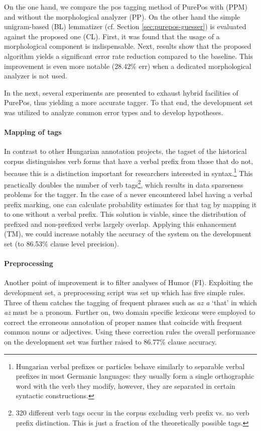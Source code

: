 On the one hand, we compare the \gls{pos} tagging method of PurePos with (PPM) and without the morphological analyzer (PP).
On the other hand the simple unigram-based (BL) lemmatizer (cf. Section \ref{sec:purepos-guesser}) is evaluated against the proposed one (CL). 
First, it was found that the usage of a morphological component is indispensable. 
Next, results show that the proposed algorithm yields a significant error rate reduction compared to the baseline. 
This improvement is even more notable  (28.42\% \acrshort{err}) when a dedicated morphological analyzer is not used.

In the next, several experiments are presented to exhaust hybrid facilities of PurePos, thus yielding a more accurate tagger. 
To that end, the development set was utilized to analyze common error types and to develop hypotheses.

\paragraph{Mapping of tags}

In contrast to other Hungarian annotation projects, the tagset of the historical corpus distinguishes verb forms that have a verbal prefix from those that do not, because this is a distinction important for researchers interested in syntax.\footnote{Hungarian verbal prefixes or particles behave similarly to separable verbal prefixes in most Germanic languages: they usually form a single orthographic word with the verb they modify, however, they are separated in certain syntactic constructions.} 
This practically doubles the number of verb tags\footnote{320 different verb tags occur in the corpus excluding verb prefix vs. no verb prefix distinction. This is just a fraction of the theoretically possible tags.}, which results in data sparseness problems for the tagger. 
In the case of a never encountered label having a verbal prefix marking, one can calculate probability estimates for that tag by mapping it to one without a verbal prefix. 
This solution is viable, since the distribution of prefixed and non-prefixed verbs largely overlap. 
Applying this enhancement (TM), we could increase notably the accuracy of the system on the development set (to 86.53\% clause level precision).

\paragraph{Preprocessing}

Another point of improvement is to filter analyses of Humor (FI). 
Exploiting the development set, a preprocessing script was set up which has five simple rules. 
Three of them catches the tagging of frequent phrases such as \emph{az a} `that' in which \emph{az} must be a pronoun. 
Further on, two domain specific lexicons were employed to correct the erroneous annotation of proper names that coincide with frequent common nouns or adjectives. 
Using these correction rules the overall performance on the development set was further raised to 86.77\% clause accuracy.


